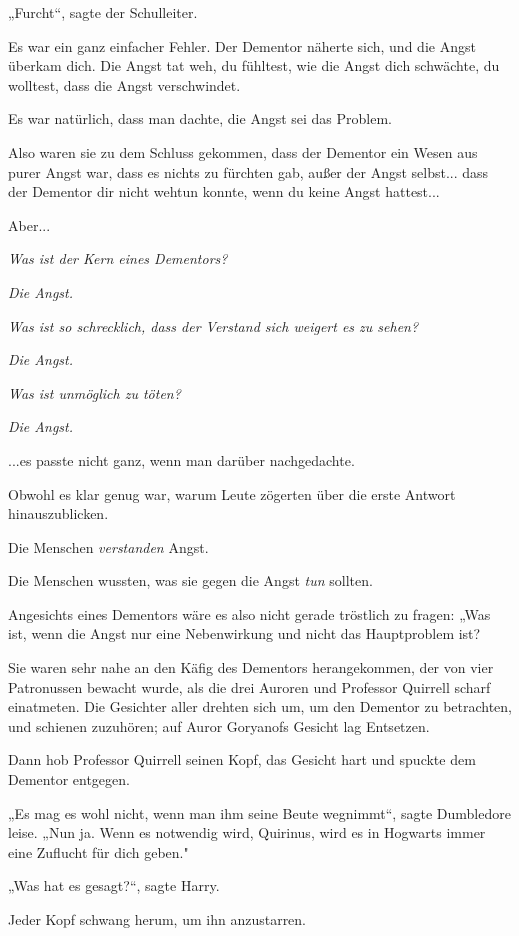 {„Furcht“, sagte der Schulleiter.

Es war ein ganz einfacher Fehler. Der Dementor näherte sich, und die Angst überkam dich. Die Angst tat weh, du fühltest, wie die Angst dich schwächte, du wolltest, dass die Angst verschwindet.

Es war natürlich, dass man dachte, die Angst sei das Problem.

Also waren sie zu dem Schluss gekommen, dass der Dementor ein Wesen aus purer Angst war, dass es nichts zu fürchten gab, außer der Angst selbst... dass der Dementor dir nicht wehtun konnte, wenn du keine Angst hattest...

Aber...

\emph{Was ist der Kern eines Dementors?}

\emph{Die Angst.}

\emph{Was ist so schrecklich, dass der Verstand sich weigert es zu sehen?}

\emph{Die Angst.}

\emph{Was ist unmöglich zu töten?}

\emph{Die Angst.}

...es passte nicht ganz, wenn man darüber nachgedachte.

Obwohl es klar genug war, warum Leute zögerten über die erste Antwort hinauszublicken.

Die Menschen \emph{verstanden} Angst.

Die Menschen wussten, was sie gegen die Angst \emph{tun} sollten.

Angesichts eines Dementors wäre es also nicht gerade tröstlich zu fragen: „Was ist, wenn die Angst nur eine Nebenwirkung und nicht das Hauptproblem ist?

Sie waren sehr nahe an den Käfig des Dementors herangekommen, der von vier Patronussen bewacht wurde, als die drei Auroren und Professor Quirrell scharf einatmeten. Die Gesichter aller drehten sich um, um den Dementor zu betrachten, und schienen zuzuhören; auf Auror Goryanofs Gesicht lag Entsetzen.

Dann hob Professor Quirrell seinen Kopf, das Gesicht hart und spuckte dem Dementor entgegen.

„Es mag es wohl nicht, wenn man ihm seine Beute wegnimmt“, sagte Dumbledore leise. „Nun ja. Wenn es notwendig wird, Quirinus, wird es in Hogwarts immer eine Zuflucht für dich geben."

„Was hat es gesagt?“, sagte Harry.

Jeder Kopf schwang herum, um ihn anzustarren.

}
